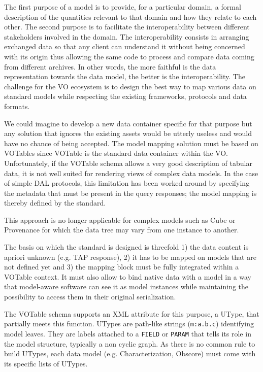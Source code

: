 
The first purpose of a model is to provide, for a particular domain, a formal description of the quantities relevant to that domain and how they relate to each other.
The second purpose is to facilitate the interoperability between  different stakeholders involved in the domain. The interoperability consists in arranging exchanged data 
so that any client can understand it without being concerned with its origin thus allowing the same code to process and compare data coming from different archives.  
In other words, the more faithful is the data representation towards the data model, the better is the interoperability.
The challenge for the VO ecosystem is to design the best way to map various data on standard models while respecting the existing frameworks, protocols and data formats.

We could imagine to develop a new data container specific for that purpose but any solution that ignores the existing assets would be utterly useless and would have no chance of being accepted.
The model mapping solution must be based on VOTables since VOTable  \citep{2019ivoa.spec.1021O} is the standard data container within the VO.
Unfortunately, if the VOTable schema allows a very good description of tabular data, it is not well suited for rendering views of complex data models.
In the case of simple DAL protocols, this limitation has been worked around by specifying the metadata that must be present in the query responses; the model mapping is thereby defined by the standard.

This approach is no longer applicable for complex models such as Cube or Provenance for which the data tree may vary from one instance to another.

The basis on which the standard is designed is threefold 1) the data content is apriori unknown (e.g. TAP response), 2) it has to be mapped on models that are not defined yet and 3) the mapping block must be fully integrated within a VOTable context.
It must also allow to bind native data with a model in a way that model-aware software can see it as model instances while maintaining the possibility to access them in their original serialization.

The VOTable schema supports an XML attribute for this purpose, a UType, that partially meets this function. 
UTypes are path-like strings (\texttt{m:a.b.c}) identifying model leaves. 
They are labels attached to a \texttt{FIELD} or \texttt{PARAM} that tells its role in the
model structure, typically a non cyclic graph. 
As there is no common rule to build UTypes,  each data model (e.g. Characterization, Obscore)  must come with its specific lists of UTypes. 

